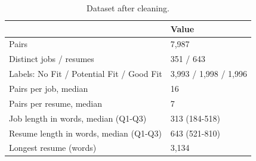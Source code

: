\begin{table}
\caption{Dataset after cleaning.}
\label{tab:t1_dataset}
\begin{tabular}{ll}
\toprule
 & Value \\
\midrule
Pairs & 7,987 \\
Distinct jobs / resumes & 351 / 643 \\
Labels: No Fit / Potential Fit / Good Fit & 3,993 / 1,998 / 1,996 \\
Pairs per job, median & 16 \\
Pairs per resume, median & 7 \\
Job length in words, median (Q1-Q3) & 313 (184-518) \\
Resume length in words, median (Q1-Q3) & 643 (521-810) \\
Longest resume (words) & 3,134 \\
\bottomrule
\end{tabular}
\end{table}
